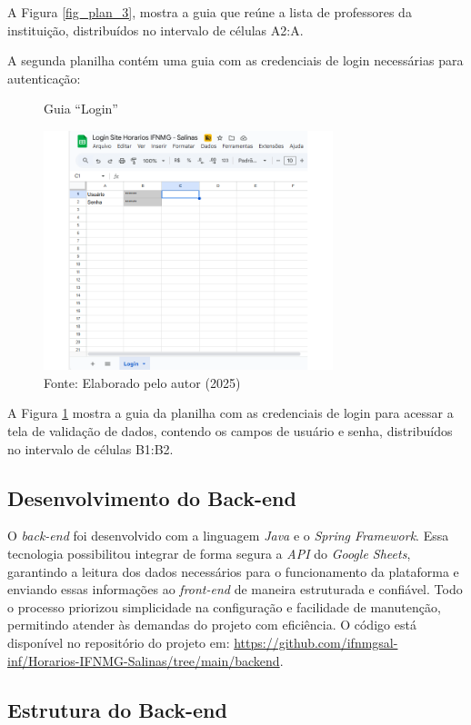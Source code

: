 A Figura \ref{fig_plan_3}, mostra a guia que reúne a lista de professores da instituição, distribuídos no intervalo de células A2:A.

A segunda planilha contém uma guia com as credenciais de login necessárias para autenticação:

\begin{figure}[htb]
    \centering
    \caption{Guia ``Login''}
    \includegraphics[width=0.75\textwidth]{Figuras/plan-4.png}
    \caption*{Fonte: Elaborado pelo autor (2025)}
    \label{fig_plan_4}
\end{figure}

A Figura \ref{fig_plan_4} mostra a guia da planilha com as credenciais de login para acessar a tela de validação de dados, contendo os campos de usuário e senha, distribuídos no intervalo de células B1:B2.

\subsection{Desenvolvimento do Back-end}

O \textit{back-end} foi desenvolvido com a linguagem \textit{Java} e o \textit{Spring Framework}. Essa tecnologia possibilitou integrar de forma segura a \textit{API} do \textit{Google Sheets}, garantindo a leitura dos dados necessários para o funcionamento da plataforma e enviando essas informações ao \textit{front-end} de maneira estruturada e confiável. Todo o processo priorizou simplicidade na configuração e facilidade de manutenção, permitindo atender às demandas do projeto com eficiência. O código está disponível no repositório do projeto em: \url{https://github.com/ifnmgsal-inf/Horarios-IFNMG-Salinas/tree/main/backend}.

\subsection{Estrutura do Back-end}

